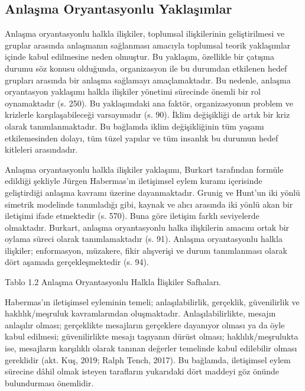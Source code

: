\documentclass[
]{book}
\begin{document}
\hypertarget{anlaux15fma-oryantasyonlu-yaklaux15fux131mlar}{%
\subsection{Anlaşma Oryantasyonlu Yaklaşımlar}\label{anlaux15fma-oryantasyonlu-yaklaux15fux131mlar}}

Anlaşma oryantasyonlu halkla ilişkiler, toplumsal ilişkilerinin geliştirilmesi ve gruplar arasında anlaşmanın sağlanması amacıyla toplumsal teorik yaklaşımlar içinde kabul edilmesine neden olmuştur. Bu yaklaşım, özellikle bir çatışma durumu söz konusu olduğunda, organizasyon ile bu durumdan etkilenen hedef grupları arasında bir anlaşma sağlamayı amaçlamaktadır. Bu nedenle, anlaşma oryantasyon yaklaşımı halkla ilişkiler yönetimi sürecinde önemli bir rol oynamaktadır (s. 250). \citep{burkart2007} Bu yaklaşımdaki ana faktör, organizasyonun problem ve krizlerle karşılaşabileceği varsayımıdır (s. 90). \citep{ayla2002halkla} İklim değişikliği de artık bir kriz olarak tanımlanmaktadır. Bu bağlamda iklim değişikliğinin tüm yaşamı etkilemesinden dolayı, tüm tüzel yapılar ve tüm insanlık bu durumun hedef kitleleri arasındadır.

Anlaşma oryantasyonlu halkla ilişkiler yaklaşımı, Burkart tarafından formüle edildiği şekliyle Jürgen Habermas'ın iletişimsel eylem kuramı içerisinde geliştirdiği anlaşma kavramı üzerine dayanmaktadır. Grunig ve Hunt'un iki yönlü simetrik modelinde tanımladığı gibi, kaynak ve alıcı arasında iki yönlü akan bir iletişimi ifade etmektedir (s. 570). \citep{ralphtench2017exploring} Buna göre iletişim farklı seviyelerde olmaktadır. Burkart, anlaşma oryantasyonlu halka ilişkilerin amacını ortak bir oylama süreci olarak tanımlamaktadır (s. 91).\citep{ayla2002halkla} Anlaşma oryantasyonlu halkla ilişkiler; enformasyon, müzakere, fikir alışverişi ve durum tanımlanması olarak dört aşamada gerçekleşmektedir (s. 94). \citep{ayla2002halkla}

Tablo 1.2 Anlaşma Oryantasyonlu Halkla İlişkiler Safhaları.

Habermas'ın iletişimsel eyleminin temeli; anlaşılabilirlik, gerçeklik, güvenilirlik ve haklılık/meşruluk kavramlarından oluşmaktadır. Anlaşılabilirlikte, mesajın anlaşılır olması; gerçeklikte mesajların gerçeklere dayanıyor olması ya da öyle kabul edilmesi; güvenilirlikte mesajı taşıyanın dürüst olması; haklılık/meşrulukta ise, mesajların karşılıklı olarak tanınan değerler temelinde kabul edilebilir olması gereklidir (akt. Kuş, 2019; Ralph Tench, 2017). Bu bağlamda, iletişimsel eylem sürecine dâhil olmak isteyen tarafların yukarıdaki dört maddeyi göz önünde bulundurması önemlidir.
\end{document}
